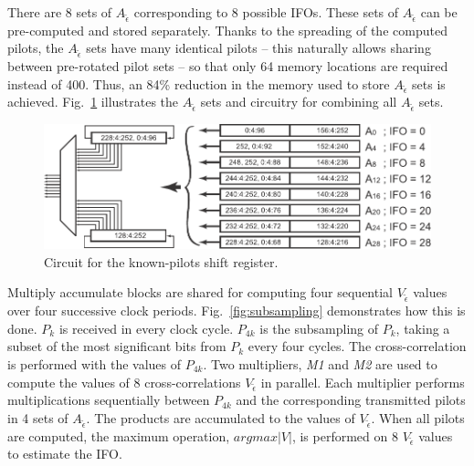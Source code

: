 There are 8 sets of $A_{\tilde{\epsilon}}$ corresponding to 8 possible IFOs.
These sets of $A_{\tilde{\epsilon}}$ can be pre-computed and stored separately.
Thanks to the spreading of the computed pilots, the $A_{\tilde{\epsilon}}$ sets have many identical pilots -- this naturally allows sharing between pre-rotated pilot sets -- so that only 64 memory locations are required instead of 400. Thus, an 84\% reduction in the memory used to store $A_{\tilde{\epsilon}}$ sets is achieved.
Fig.~\ref{fig:Pilots} illustrates the $A_{\tilde{\epsilon}}$ sets and circuitry for combining all $A_{\tilde{\epsilon}}$ sets.
\begin{figure}
	\centerline{\includegraphics [width=0.8\columnwidth] {figures/Pilots.pdf} }
	\caption{Circuit for the known-pilots shift register.}
	\label{fig:Pilots}
\end{figure}

Multiply accumulate blocks are shared for computing four sequential $V_{\tilde{\epsilon}}$ values over four successive clock periods. Fig.~\ref{fig:subsampling} demonstrates how this is done. $P_k$ is received in every clock cycle. $P_{4k}$ is the subsampling of $P_k$, taking a subset of the most significant bits from $P_k$ every four cycles. The cross-correlation is performed with the values of $P_{4k}$. Two multipliers, \emph{M1} and \emph{M2} are used to compute the values of 8 cross-correlations $V_{\tilde{\epsilon}}$ in parallel. Each multiplier performs multiplications sequentially between $P_{4k}$ and the corresponding transmitted pilots in 4 sets of $A_{\tilde{\epsilon}}$. The products are accumulated to the values of $V_{\tilde{\epsilon}}$. When all pilots are computed, the maximum operation, $argmax|V|$, is performed on 8 $V_{\tilde{\epsilon}}$ values to estimate the IFO.

